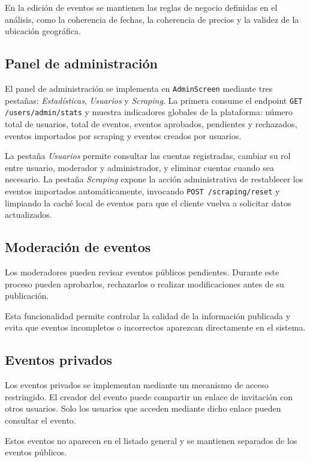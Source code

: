 En la edición de eventos se mantienen las reglas de negocio definidas en el análisis, como la coherencia de fechas, la coherencia de precios y la validez de la ubicación geográfica.

\subsection{Panel de administración}

El panel de administración se implementa en \texttt{AdminScreen} mediante tres pestañas: \textit{Estadísticas}, \textit{Usuarios} y \textit{Scraping}. La primera consume el endpoint \texttt{GET /users/admin/stats} y muestra indicadores globales de la plataforma: número total de usuarios, total de eventos, eventos aprobados, pendientes y rechazados, eventos importados por scraping y eventos creados por usuarios.

La pestaña \textit{Usuarios} permite consultar las cuentas registradas, cambiar su rol entre usuario, moderador y administrador, y eliminar cuentas cuando sea necesario. La pestaña \textit{Scraping} expone la acción administrativa de restablecer los eventos importados automáticamente, invocando \texttt{POST /scraping/reset} y limpiando la caché local de eventos para que el cliente vuelva a solicitar datos actualizados.

\subsection{Moderación de eventos}

Los moderadores pueden revisar eventos públicos pendientes. Durante este proceso pueden aprobarlos, rechazarlos o realizar modificaciones antes de su publicación.

Esta funcionalidad permite controlar la calidad de la información publicada y evita que eventos incompletos o incorrectos aparezcan directamente en el sistema.

\subsection{Eventos privados}

Los eventos privados se implementan mediante un mecanismo de acceso restringido. El creador del evento puede compartir un enlace de invitación con otros usuarios. Solo los usuarios que acceden mediante dicho enlace pueden consultar el evento.

Estos eventos no aparecen en el listado general y se mantienen separados de los eventos públicos.

